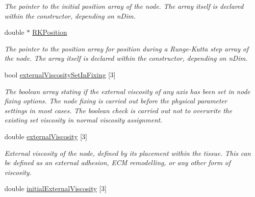 \begin{DoxyCompactItemize}
\begin{DoxyCompactList}\small\item\em The pointer to the initial position array of the node. The array itself is declared within the constructor, depending on n\+Dim. \end{DoxyCompactList}\item 
\hypertarget{classNode_abfa97f5fa4e95c932b4e3e0daabb062a}{}double $\ast$ \hyperlink{classNode_abfa97f5fa4e95c932b4e3e0daabb062a}{R\+K\+Position}\label{classNode_abfa97f5fa4e95c932b4e3e0daabb062a}

\begin{DoxyCompactList}\small\item\em The pointer to the position array for position during a Runge-\/\+Kutta step array of the node. The array itself is declared within the constructor, depending on n\+Dim. \end{DoxyCompactList}\item 
\hypertarget{classNode_a03f2f0310bec3504b082d0f707fa3db2}{}bool \hyperlink{classNode_a03f2f0310bec3504b082d0f707fa3db2}{external\+Viscosity\+Set\+In\+Fixing} \mbox{[}3\mbox{]}\label{classNode_a03f2f0310bec3504b082d0f707fa3db2}

\begin{DoxyCompactList}\small\item\em The boolean array stating if the external viscosity of any axis has been set in node fixing options. The node fixing is carried out before the physical parameter settings in most cases. The boolean check is carried out not to overwrite the existing set viscosity in normal viscosity assignment. \end{DoxyCompactList}\item 
\hypertarget{classNode_a9bb34133d43eb0f29bfd0d0b65df395d}{}double \hyperlink{classNode_a9bb34133d43eb0f29bfd0d0b65df395d}{external\+Viscosity} \mbox{[}3\mbox{]}\label{classNode_a9bb34133d43eb0f29bfd0d0b65df395d}

\begin{DoxyCompactList}\small\item\em External viscosity of the node, defined by its placement within the tissue. This can be defined as an external adhesion, E\+C\+M remodelling, or any other form of viscosity. \end{DoxyCompactList}\item 
\hypertarget{classNode_a60c2515f86b41fbb3d413cc416c3ee26}{}double \hyperlink{classNode_a60c2515f86b41fbb3d413cc416c3ee26}{initial\+External\+Viscosity} \mbox{[}3\mbox{]}\label{classNode_a60c2515f86b41fbb3d413cc416c3ee26}


\end{DoxyCompactItemize}
